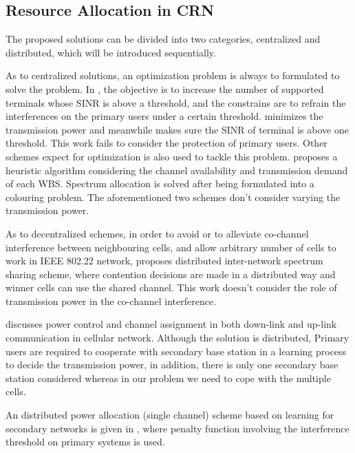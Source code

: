 \subsection{Resource Allocation in CRN}

The proposed solutions can be divided into two categories, centralized and distributed, which will be introduced sequentially.

As to centralized solutions, an optimization problem is always to formulated to solve the problem.
In \cite{downlink-centralized-08-TWC}, the objective is to increase the number of supported terminals whose SINR is above a threshold, and the constrains are to refrain the interferences on the primary users under a certain threshold.
\cite{joint_power_channel_linkpair_08ICT} minimizes the transmission power and meanwhile makes sure the SINR of terminal is above one threshold.
This work fails to consider the protection of primary users.
Other schemes expect for optimization is also used to tackle this problem.
\cite{centralized_80222_sharing_ifip2011} proposes a heuristic algorithm considering the channel availability and transmission demand of each WBS.
Spectrum allocation is solved after being formulated into a colouring problem.
The aforementioned two schemes don't consider varying the transmission power.

As to decentralized schemes, in order to avoid or to alleviate co-channel interference between neighbouring cells, and allow arbitrary number of cells to work in IEEE 802.22 network, \cite{Inter-Network_Spectrum_Sharing_80222_08} proposes distributed inter-network spectrum sharing scheme, where contention decisions are made in a distributed way and winner cells can use the shared channel.
This work doesn't consider the role of transmission power in the co-channel interference.

\cite{HoangPowerChannel2010} discusses power control and channel assignment in both down-link and up-link communication in cellular network. 
Although the solution is distributed, Primary users are required to cooperate with secondary base station in a learning process to decide the transmission power, in addition, there is only one secondary base station considered whereas in our problem we need to cope with the multiple cells.

An distributed power allocation (single channel) scheme based on learning for secondary networks is given in \cite{aggregatedInf_Galindo_crowncom09}, where penalty function involving the interference threshold on primary systems is used.

